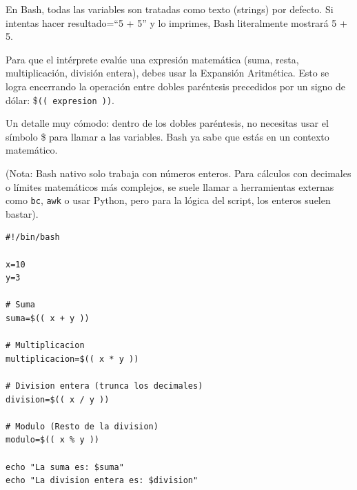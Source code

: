 En Bash, todas las variables son tratadas como texto (strings) por defecto. Si intentas hacer resultado=``5 + 5'' y lo imprimes, Bash literalmente mostrará 5 + 5.

Para que el intérprete evalúe una expresión matemática (suma, resta, multiplicación, división entera), debes usar la Expansión Aritmética. Esto se logra encerrando la operación entre dobles paréntesis precedidos por un signo de dólar: \$\lstinline!(( expresion ))!.

Un detalle muy cómodo: dentro de los dobles paréntesis, no necesitas usar el símbolo \$ para llamar a las variables. Bash ya sabe que estás en un contexto matemático.

(Nota: Bash nativo solo trabaja con números enteros. Para cálculos con decimales o límites matemáticos más complejos, se suele llamar a herramientas externas como \lstinline!bc!, \lstinline!awk! o usar Python, pero para la lógica del script, los enteros suelen bastar).

\begin{ejemplo}
\begin{lstlisting}
#!/bin/bash

x=10
y=3

# Suma
suma=$(( x + y ))

# Multiplicacion
multiplicacion=$(( x * y ))

# Division entera (trunca los decimales)
division=$(( x / y ))

# Modulo (Resto de la division)
modulo=$(( x % y ))

echo "La suma es: $suma"
echo "La division entera es: $division"
\end{lstlisting}
\end{ejemplo}
